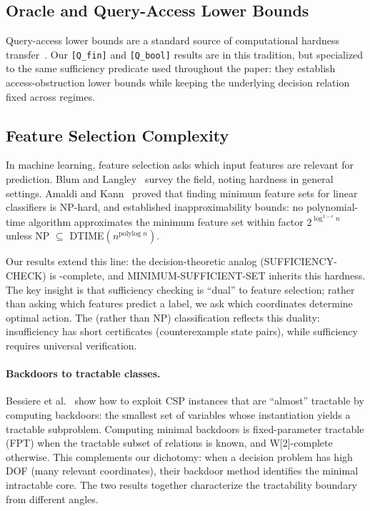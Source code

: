 \subsection{Oracle and Query-Access Lower Bounds}

Query-access lower bounds are a standard source of computational hardness transfer~\cite{dobzinski2012query}. Our \texttt{[Q\_fin]} and \texttt{[Q\_bool]} results are in this tradition, but specialized to the same sufficiency predicate used throughout the paper: they establish access-obstruction lower bounds while keeping the underlying decision relation fixed across regimes.

\subsection{Feature Selection Complexity}

In machine learning, feature selection asks which input features are relevant for prediction. Blum and Langley~\cite{blum1997selection} survey the field, noting hardness in general settings. Amaldi and Kann~\cite{amaldi1998complexity} proved that finding minimum feature sets for linear classifiers is NP-hard, and established inapproximability bounds: no polynomial-time algorithm approximates the minimum feature set within factor $2^{\log^{1-\epsilon} n}$ unless NP $\subseteq$ DTIME$(n^{\text{polylog } n})$.

Our results extend this line: the decision-theoretic analog (SUFFICIENCY-CHECK) is \coNP-complete, and MINIMUM-SUFFICIENT-SET inherits this hardness. The key insight is that sufficiency checking is ``dual'' to feature selection; rather than asking which features predict a label, we ask which coordinates determine optimal action. The \coNP{} (rather than NP) classification reflects this duality: insufficiency has short certificates (counterexample state pairs), while sufficiency requires universal verification.

\paragraph{Backdoors to tractable classes.} Bessiere et al.~\cite{bessiere2013detecting} show how to exploit CSP instances that are ``almost'' tractable by computing backdoors: the smallest set of variables whose instantiation yields a tractable subproblem. Computing minimal backdoors is fixed-parameter tractable (FPT) when the tractable subset of relations is known, and W[2]-complete otherwise. This complements our dichotomy: when a decision problem has high DOF (many relevant coordinates), their backdoor method identifies the minimal intractable core. The two results together characterize the tractability boundary from different angles.


